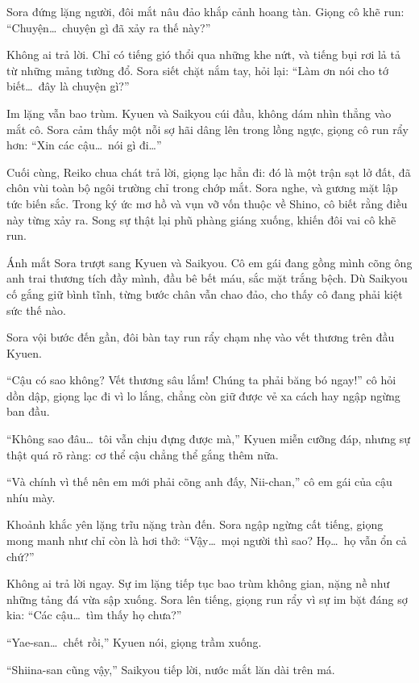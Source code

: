 \documentclass[../main.tex]{subfiles}
\begin{document}

Sora đứng lặng người, đôi mắt nâu đảo khắp cảnh hoang tàn. Giọng cô khẽ run: ``Chuyện\dots\ chuyện gì đã xảy ra thế này?''

Không ai trả lời. Chỉ có tiếng gió thổi qua những khe nứt, và tiếng bụi rơi lả tả từ những mảng tường đổ. Sora siết chặt nắm tay, hỏi lại: ``Làm ơn nói cho tớ biết\dots\ đây là chuyện gì?''

Im lặng vẫn bao trùm. Kyuen và Saikyou cúi đầu, không dám nhìn thẳng vào mắt cô. Sora cảm thấy một nỗi sợ hãi dâng lên trong lồng ngực, giọng cô run rẩy hơn: ``Xin các cậu\dots\ nói gì đi\dots''

Cuối cùng, Reiko chua chát trả lời, giọng lạc hẳn đi: đó là một trận sạt lở đất, đã chôn vùi toàn bộ ngôi trường chỉ trong chớp mắt. Sora nghe, và gương mặt lập tức biến sắc. Trong ký ức mơ hồ và vụn vỡ vốn thuộc về Shino, cô biết rằng điều này từng xảy ra. Song sự thật lại phũ phàng giáng xuống, khiến đôi vai cô khẽ run.

Ánh mắt Sora trượt sang Kyuen và Saikyou. Cô em gái đang gồng mình cõng ông anh trai thương tích đầy mình, đầu bê bết máu, sắc mặt trắng bệch. Dù Saikyou cố gắng giữ bình tĩnh, từng bước chân vẫn chao đảo, cho thấy cô đang phải kiệt sức thế nào.

Sora vội bước đến gần, đôi bàn tay run rẩy chạm nhẹ vào vết thương trên đầu Kyuen.

``Cậu có sao không? Vết thương sâu lắm! Chúng ta phải băng bó ngay!'' cô hỏi dồn dập, giọng lạc đi vì lo lắng, chẳng còn giữ được vẻ xa cách hay ngập ngừng ban đầu.

``Không sao đâu\dots\ tôi vẫn chịu đựng được mà,'' Kyuen miễn cưỡng đáp, nhưng sự thật quá rõ ràng: cơ thể cậu chẳng thể gắng thêm nữa.

``Và chính vì thế nên em mới phải cõng anh đấy, Nii-chan,'' cô em gái của cậu nhíu mày.

Khoảnh khắc yên lặng trĩu nặng tràn đến. Sora ngập ngừng cất tiếng, giọng mong manh như chỉ còn là hơi thở: ``Vậy\dots\ mọi người thì sao? Họ\dots\ họ vẫn ổn cả chứ?''

Không ai trả lời ngay. Sự im lặng tiếp tục bao trùm không gian, nặng nề như những tảng đá vừa sập xuống. Sora lên tiếng, giọng run rẩy vì sự im bặt đáng sợ kia: ``Các cậu\dots\ tìm thấy họ chưa?''

``Yae-san\dots\ chết rồi,'' Kyuen nói, giọng trầm xuống.

``Shiina-san cũng vậy,'' Saikyou tiếp lời, nước mắt lăn dài trên má.
\end{document}

